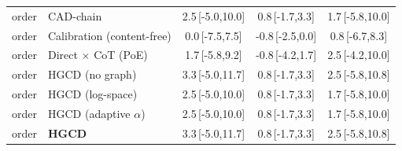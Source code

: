 \begin{tabular}{llccc}
order & CAD-chain & 2.5\,{\scriptsize[-5.0,10.0]} & 0.8\,{\scriptsize[-1.7,3.3]} & 1.7\,{\scriptsize[-5.8,10.0]} \\
order & Calibration (content-free) & 0.0\,{\scriptsize[-7.5,7.5]} & -0.8\,{\scriptsize[-2.5,0.0]} & 0.8\,{\scriptsize[-6.7,8.3]} \\
order & Direct $\times$ CoT (PoE) & 1.7\,{\scriptsize[-5.8,9.2]} & -0.8\,{\scriptsize[-4.2,1.7]} & 2.5\,{\scriptsize[-4.2,10.0]} \\
order & HGCD (no graph) & 3.3\,{\scriptsize[-5.0,11.7]} & 0.8\,{\scriptsize[-1.7,3.3]} & 2.5\,{\scriptsize[-5.8,10.8]} \\
order & HGCD (log-space) & 2.5\,{\scriptsize[-5.0,10.0]} & 0.8\,{\scriptsize[-1.7,3.3]} & 1.7\,{\scriptsize[-5.8,10.0]} \\
order & HGCD (adaptive $\alpha$) & 2.5\,{\scriptsize[-5.0,10.0]} & 0.8\,{\scriptsize[-1.7,3.3]} & 1.7\,{\scriptsize[-5.8,10.0]} \\
order & \textbf{HGCD} & 3.3\,{\scriptsize[-5.0,11.7]} & 0.8\,{\scriptsize[-1.7,3.3]} & 2.5\,{\scriptsize[-5.8,10.8]} \\
\bottomrule
\end{tabular}
